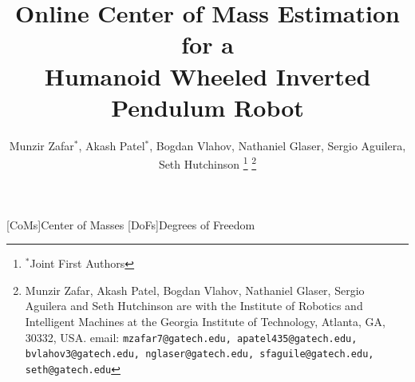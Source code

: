\documentclass[letterpaper, 10 pt, conference]{ieeeconf}
\begin{document}
\frenchspacing

\title{\LARGE \bf Online Center of Mass Estimation for a \\Humanoid Wheeled
Inverted Pendulum Robot}

\author{Munzir Zafar$^*$, Akash Patel$^*$, Bogdan Vlahov, Nathaniel Glaser,
Sergio Aguilera, Seth Hutchinson
\thanks{$^{*}$Joint First Authors}%
\thanks{Munzir Zafar, Akash Patel, Bogdan Vlahov, Nathaniel Glaser, Sergio
Aguilera and Seth Hutchinson are with the Institute of Robotics and Intelligent
Machines at the Georgia Institute of Technology, Atlanta, GA, 30332, USA. email:
{\tt\small mzafar7@gatech.edu, apatel435@gatech.edu, bvlahov3@gatech.edu,
nglaser@gatech.edu, sfaguile@gatech.edu, seth@gatech.edu}}%
}


\begin{acronym}
[CoMs]{Center of Masses}
[DoFs]{Degrees of Freedom}
\end{acronym}
\end{document}
